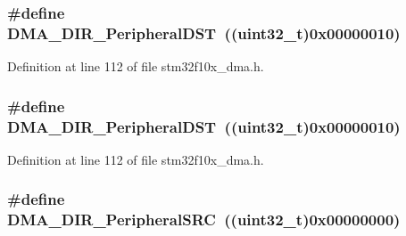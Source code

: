 \subsubsection[{\texorpdfstring{D\+M\+A\+\_\+\+D\+I\+R\+\_\+\+Peripheral\+D\+ST}{DMA_DIR_PeripheralDST}}]{\setlength{\rightskip}{0pt plus 5cm}\#define D\+M\+A\+\_\+\+D\+I\+R\+\_\+\+Peripheral\+D\+ST~(({\bf uint32\+\_\+t})0x00000010)}\hypertarget{group___d_m_a__data__transfer__direction_ga51567b748ddac277743c65c20275971a}{}\label{group___d_m_a__data__transfer__direction_ga51567b748ddac277743c65c20275971a}


Definition at line 112 of file stm32f10x\+\_\+dma.\+h.

\subsubsection[{\texorpdfstring{D\+M\+A\+\_\+\+D\+I\+R\+\_\+\+Peripheral\+D\+ST}{DMA_DIR_PeripheralDST}}]{\setlength{\rightskip}{0pt plus 5cm}\#define D\+M\+A\+\_\+\+D\+I\+R\+\_\+\+Peripheral\+D\+ST~(({\bf uint32\+\_\+t})0x00000010)}\hypertarget{group___d_m_a__data__transfer__direction_ga51567b748ddac277743c65c20275971a}{}\label{group___d_m_a__data__transfer__direction_ga51567b748ddac277743c65c20275971a}


Definition at line 112 of file stm32f10x\+\_\+dma.\+h.

\subsubsection[{\texorpdfstring{D\+M\+A\+\_\+\+D\+I\+R\+\_\+\+Peripheral\+S\+RC}{DMA_DIR_PeripheralSRC}}]{\setlength{\rightskip}{0pt plus 5cm}\#define D\+M\+A\+\_\+\+D\+I\+R\+\_\+\+Peripheral\+S\+RC~(({\bf uint32\+\_\+t})0x00000000)}\hypertarget{group___d_m_a__data__transfer__direction_ga5ce120a044359410136695a2c05df68e}{}\label{group___d_m_a__data__transfer__direction_ga5ce120a044359410136695a2c05df68e}


